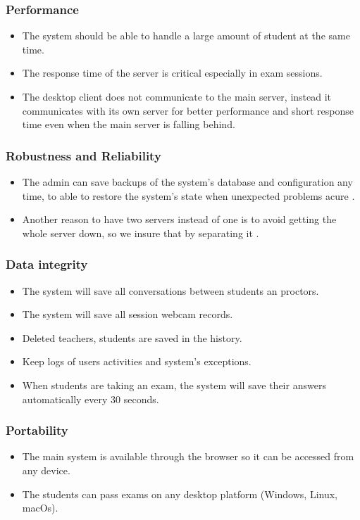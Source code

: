 \documentclass[]{uc2pfecaneva}
\begin{document}
\raggedright\subsubsection{Performance}
\begin{itemize}
	\item The system should be able to handle a large amount of student at the same time.
	\item The response time of the server is critical especially in exam sessions.
	\item The desktop client does not communicate to the main server, instead it communicates with its own server for better performance and short response time even when the main server is falling behind.
\end{itemize}

\raggedright\subsubsection{Robustness and Reliability}
\begin{itemize}
	\item The admin can save backups of the system’s database and configuration any time, to able to restore the system’s state when  unexpected problems acure .
	\item Another reason to have two servers instead of one is to avoid getting the whole server down, so we insure that by separating it .
\end{itemize}

\raggedright\subsubsection{Data integrity}
\begin{itemize}
	\item The system will save all conversations between students an proctors.
	\item The system will save all session webcam records.
	\item Deleted teachers, students are saved in the history.
	\item Keep logs of users activities and system’s exceptions.
	\item When students are taking an exam, the system will save their answers automatically every 30 seconds.
\end{itemize}

\raggedright\subsubsection{Portability}
\begin{itemize}
	\item The main system is available through the browser so it can be accessed from any device.
	\item The students can pass exams on any desktop platform (Windows, Linux, macOs).
\end{itemize}
\end{document}

